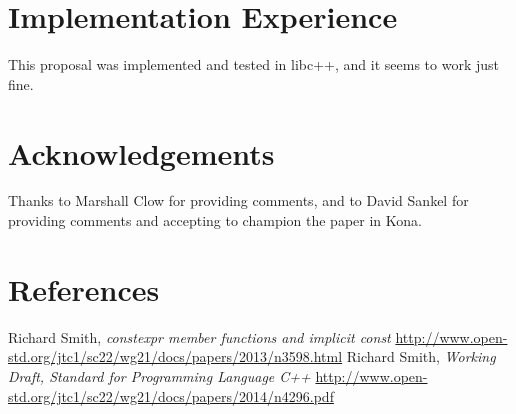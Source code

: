 \documentclass[11pt]{article}
\begin{document}
\section{Implementation Experience}
This proposal was implemented and tested in libc++, and it seems to work just fine.


\section{Acknowledgements}
Thanks to Marshall Clow for providing comments, and to David Sankel for providing
comments and accepting to champion the paper in Kona.

\section{References}
\renewcommand{\section}[2]{}%
\begin{thebibliography}{9}

    Richard Smith,
    \emph{constexpr member functions and implicit const}\newline
    \url{http://www.open-std.org/jtc1/sc22/wg21/docs/papers/2013/n3598.html}
    Richard Smith,
    \emph{Working Draft, Standard for Programming Language C++}\newline
    \url{http://www.open-std.org/jtc1/sc22/wg21/docs/papers/2014/n4296.pdf}

\end{thebibliography}
\end{document}
